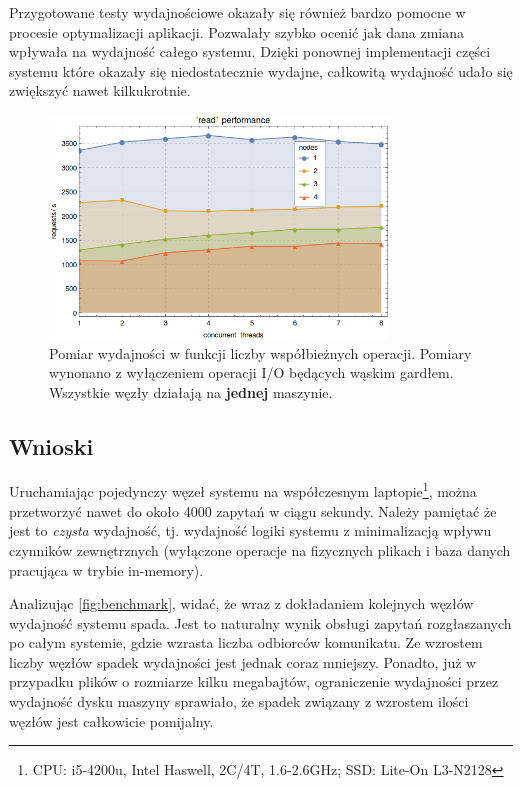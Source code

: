 Przygotowane testy wydajnościowe okazały się również bardzo pomocne w procesie optymalizacji aplikacji. Pozwalały szybko ocenić jak dana zmiana wpływała na wydajność całego systemu. Dzięki ponownej implementacji części systemu które okazały się niedostatecznie wydajne, całkowitą wydajność udało się zwiększyć nawet kilkukrotnie.

\begin{figure}[!htbp]
	\centering
	\includegraphics[width=0.8\textwidth]{images/fig04-benchmark.png}
	\caption[Pomiar wydajności w funkcji liczby współbieżnych operacji.]{Pomiar wydajności w funkcji liczby współbieżnych operacji. Pomiary wynonano z wyłączeniem operacji I/O będących wąskim gardłem.  Wszystkie węzły działają na \textbf{jednej} maszynie.}
	\label{fig:benchmark}
\end{figure}

\subsection{Wnioski}

Uruchamiając pojedynczy węzeł systemu na współczesnym laptopie\footnote{CPU: i5-4200u, Intel Haswell, 2C/4T, 1.6-2.6GHz; SSD: Lite-On L3-N2128}, można przetworzyć nawet do około 4000 zapytań w ciągu sekundy. Należy pamiętać że jest to \textit{czysta} wydajność, tj. wydajność logiki systemu z minimalizacją wpływu czynników zewnętrznych (wyłączone operacje na fizycznych plikach i baza danych pracująca w trybie in-memory).

Analizując \autoref{fig:benchmark}, widać, że wraz z dokładaniem kolejnych węzłów wydajność systemu spada. Jest to naturalny wynik obsługi zapytań rozgłaszanych po całym systemie, gdzie wzrasta liczba odbiorców komunikatu. Ze wzrostem liczby węzłów spadek wydajności jest jednak coraz mniejszy. Ponadto, już w przypadku plików o rozmiarze kilku megabajtów, ograniczenie wydajności przez wydajność dysku maszyny sprawiało, że spadek związany z wzrostem ilości węzłów jest całkowicie pomijalny.

